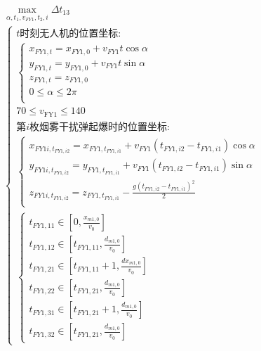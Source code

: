 \documentclass[../main.tex]{subfiles}
\begin{document}
\begin{align}
  \begin{array}{c}
\underset{\alpha ,t_1,v_{FY1},t_2,i}{\max}\Delta t_{13}
  \\
\left\{ \begin{array}{l}
	t\text{时刻无人机的位置坐标:}\\
	\left\{ \begin{array}{l}
	x_{FY1,t}=x_{FY1,0}+v_{FY1}t\cos \alpha \\
	y_{FY1,t}=y_{FY1,0}+v_{FY1}t\sin \alpha \\
	z_{FY1,t}=z_{FY1,0}\\
	0\leq \alpha \leq 2\pi \\
\end{array} \right.\\
  70 \leq v_{\text{FY1}} \leq 140\\
	\text{第$i$枚烟雾干扰弹起爆时的位置坐标:}\\
	\left\{ \begin{array}{l}
	x_{FY1i,t_{FY1,i2}}=x_{FY1,t_{FY1,i1}}+v_{FY1}\left( t_{FY1,i2}-t_{FY1,i1} \right) \cos \alpha\\
	y_{FY1i,t_{FY1,i2}}=y_{FY1,t_{FY1,i1}}+v_{FY1}\left( t_{FY1,i2}-t_{FY1,i1} \right) \sin \alpha\\
	z_{FY1i,t_{FY1,i2}}=z_{FY1,t_{FY1,i1}}-\frac{g\left( t_{FY1,i2}-t_{FY1,i1} \right) ^2}{2}\\
\end{array} \right. \\
	\left\{ \begin{array}{l}
	t_{FY1,11}\in \left[ 0, \frac{x_{m1,0}}{v_0} \right]
	\\t_{FY1,12}\in \left[ t_{FY1,11}, \frac{d_{m1,0}}{v_0} \right]
	\\t_{FY1,21}\in \left[ t_{FY1,11}+1, \frac{dx_{m1,0}}{v_0} \right]
	\\t_{FY1,22}\in \left[ t_{FY1,21}, \frac{d_{m1,0}}{v_0} \right]
	\\t_{FY1,31}\in \left[ t_{FY1,21}+1, \frac{d_{m1,0}}{v_0} \right]
	\\t_{FY1,32}\in \left[ t_{FY1,21}, \frac{d_{m1,0}}{v_0} \right]
\end{array} \right. 
\end{array} \right.  
\end{array}
\end{align}

  
\end{document}
